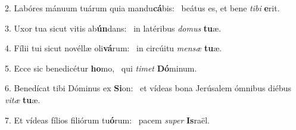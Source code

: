 2. Labóres mánuum tuárum quia mandu\textbf{cá}bis: \ast\  beátus es, et bene \textit{ti}\textit{bi} \textbf{e}rit.\

3. Uxor tua sicut vitis ab\textbf{ún}dans: \ast\  in latéribus \textit{do}\textit{mus} \textbf{tu}æ.\

4. Fílii tui sicut novéllæ oli\textbf{vá}rum: \ast\  in circúitu \textit{men}\textit{sæ} \textbf{tu}æ.\

5. Ecce sic benedicétur \textbf{ho}mo, \ast\  qui \textit{ti}\textit{met} \textbf{Dó}minum.\

6. Benedícat tibi Dóminus ex \textbf{Si}on: \ast\  et vídeas bona Jerúsalem ómnibus diébus \textit{vi}\textit{tæ} \textbf{tu}æ.\

7. Et vídeas fílios filiórum tu\textbf{ó}rum: \ast\  pacem \textit{su}\textit{per} \textbf{Is}raël.\


